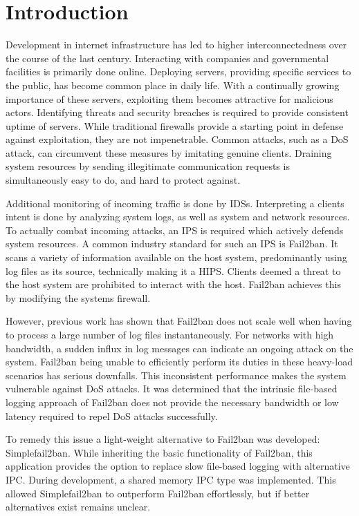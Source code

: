 %
%

\chapter{Introduction}
\label{cha:introduction}
Development in internet infrastructure has led to higher interconnectedness over the course of the last century.
Interacting with companies and governmental facilities is primarily done online.
Deploying servers, providing specific services to the public, has become common place in daily life.
With a continually growing importance of these servers, exploiting them becomes attractive for malicious actors.
Identifying threats and security breaches is required to provide consistent uptime of servers.
While traditional firewalls provide a starting point in defense against exploitation, they are not impenetrable.
Common attacks, such as a \ac{DoS} attack, can circumvent these measures by imitating genuine clients.
Draining system resources by sending illegitimate communication requests is simultaneously easy to do, and hard to protect against.

Additional monitoring of incoming traffic is done by \ac{IDSs}.
Interpreting a clients intent is done by analyzing system logs, as well as system and network resources.
To actually combat incoming attacks, an \ac{IPS} is required which actively defends system resources.
A common industry standard for such an \ac{IPS} is Fail2ban\cite{git:fail2ban}.
It scans a variety of information available on the host system, predominantly using log files as its source, technically making it a \ac{HIPS}.
Clients deemed a threat to the host system are prohibited to interact with the host.
Fail2ban achieves this by modifying the systems firewall.

However, previous work has shown that Fail2ban does not scale well when having to process a large number of log files instantaneously\cite{mikolajczak:ebpf}.
For networks with high bandwidth, a sudden influx in log messages can indicate an ongoing attack on the system.
Fail2ban being unable to efficiently perform its duties in these heavy-load scenarios has serious downfalls.
This inconsistent performance makes the system vulnerable against \ac{DoS} attacks.
It was determined that the intrinsic file-based logging approach of Fail2ban does not provide the necessary bandwidth or low latency required to repel \ac{DoS} attacks successfully.

To remedy this issue a light-weight alternative to Fail2ban was developed: Simplefail2ban\cite{raatschen:ipc}.
While inheriting the basic functionality of Fail2ban, this application provides the option to replace slow file-based logging with alternative \ac{IPC}.
During development, a shared memory \ac{IPC} type was implemented.
This allowed Simplefail2ban to outperform Fail2ban effortlessly\cite{raatschen:ipc}, but if better alternatives exist remains unclear.

